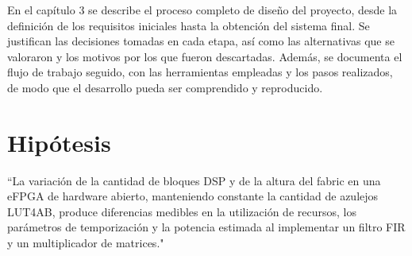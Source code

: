 En el capítulo 3 se describe el proceso completo de diseño del proyecto, 
desde la definición de los requisitos iniciales hasta la obtención del sistema final. 
Se justifican las decisiones tomadas en cada etapa, así como las alternativas que se 
valoraron y los motivos por los que fueron descartadas. Además, se documenta el flujo 
de trabajo seguido, con las herramientas empleadas y los pasos realizados, de modo que 
el desarrollo pueda ser comprendido y reproducido.

%







\setlength{\parskip}{2.5mm}

\section{Hipótesis}
     ``La variación de la cantidad de bloques DSP y de la altura del fabric en una 
     eFPGA de hardware abierto, manteniendo constante la cantidad de azulejos LUT4AB, 
     produce diferencias medibles en la utilización de recursos, los parámetros de 
     temporización y la potencia estimada al implementar un filtro FIR y un multiplicador 
     de matrices."

